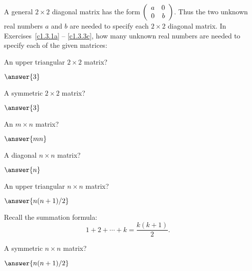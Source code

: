 \documentclass{ximera}
\begin{document}
\noindent A general $2\times 2$ diagonal matrix has the form
$\left(\begin{array}{rr} a & 0\\ 0 &b\end{array}\right)$.  Thus the two unknown real numbers $a$ and $b$ are
needed to specify each $2\times 2$ diagonal matrix.  In
Exercises~\ref{c1.3.1a} -- \ref{c1.3.3c}, how many unknown real numbers
are needed to specify each of the given matrices:
\begin{exercise}  \label{c1.3.1a}
An upper triangular $2\times 2$ matrix? \begin{prompt}$\answer{3}$\end{prompt}
\end{exercise}
\begin{exercise}  \label{c1.3.1b}
A symmetric $2\times 2$ matrix? \begin{prompt}$\answer{3}$\end{prompt}
\end{exercise}
\begin{exercise}  \label{c1.3.2}
An $m\times n$ matrix? \begin{prompt}$\answer{mn}$\end{prompt}
\end{exercise}
\begin{exercise}  \label{c1.3.3a}
A diagonal $n\times n$ matrix? \begin{prompt}$\answer{n}$\end{prompt}
\end{exercise}
\begin{exercise}  \label{c1.3.3b}
  An upper triangular $n\times n$ matrix? \begin{prompt}$\answer{n(n+1)/2}$\end{prompt}
  \begin{hint}Recall the
    summation formula:
    \[
      1 + 2 + \cdots + k = \frac{k(k+1)}{2}.
    \]
  \end{hint}
\end{exercise}
\begin{exercise}  \label{c1.3.3c}
A symmetric $n\times n$ matrix?   \begin{prompt}$\answer{n(n+1)/2}$\end{prompt}
\end{exercise}
\end{document}
